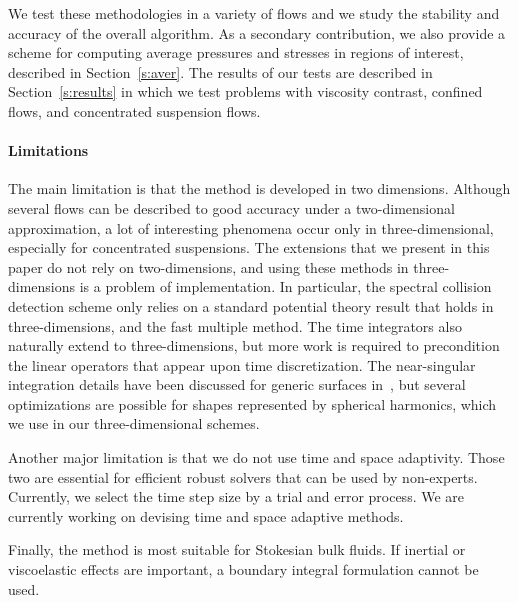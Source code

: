 \begin{itemize}
\end{itemize}
We test these methodologies in a variety of flows and we study the
stability and accuracy of the overall algorithm.  As a secondary
contribution, we also provide a scheme for computing average pressures
and stresses in regions of interest, described in
Section~\ref{s:aver}.  The results of our tests are described in
Section~\ref{s:results} in which we test problems with viscosity
contrast, confined flows, and concentrated suspension flows.

\paragraph{Limitations} 
The main limitation is that the method is developed in two dimensions.
Although several flows can be described to good accuracy under a
two-dimensional approximation, a lot of interesting phenomena occur
only in three-dimensional, especially for concentrated suspensions.
The extensions that we present in this paper do not rely on
two-dimensions, and using these methods in three-dimensions is a
problem of implementation.  In particular, the spectral collision
detection scheme only relies on a standard potential theory result that
holds in three-dimensions, and the fast multiple method.  The time
integrators also naturally extend to three-dimensions, but more work is
required to precondition the linear operators that appear upon time
discretization.  The near-singular integration details have been
discussed for generic surfaces in~\cite{ying-biros-zorin06}, but
several optimizations are possible for shapes represented by spherical
harmonics, which we use in our three-dimensional schemes.

Another major limitation is that we do not use time and space
adaptivity.  Those two are essential for efficient robust solvers that
can be used by non-experts.  Currently, we select the time step size by
a trial and error process.  We are currently working on devising time
and space adaptive methods.

Finally, the method is most suitable for Stokesian bulk fluids.  If
inertial or viscoelastic effects are important, a boundary integral
formulation cannot be used.

